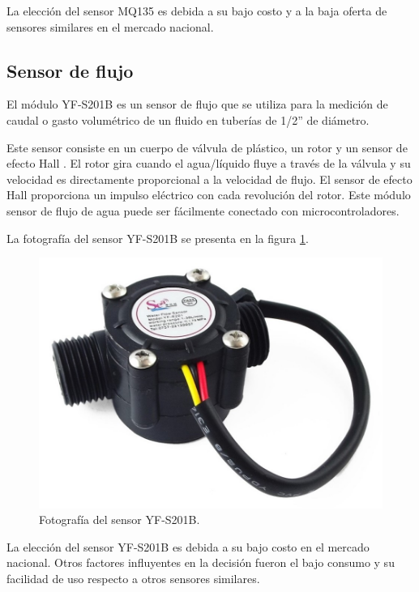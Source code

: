 
La elección del sensor MQ135 es debida a su bajo costo y a la baja oferta de sensores similares en el mercado nacional.

\subsection{Sensor de flujo}

El módulo YF-S201B \citep{WEBSITE:YF-S201B} es un sensor de flujo que se utiliza para la medición de caudal o gasto volumétrico de un fluido en tuberías de 1/2” de diámetro.

Este sensor consiste en un cuerpo de válvula de plástico, un rotor y un sensor de efecto Hall \citep{WEBSITE:EFECTOHALL}. El rotor gira cuando el agua/líquido fluye a través de la válvula y su velocidad es directamente proporcional a la velocidad de flujo. El sensor de efecto Hall proporciona un impulso eléctrico con cada revolución del rotor. Este módulo sensor de flujo de agua puede ser fácilmente conectado con microcontroladores.

La fotografía del sensor YF-S201B se presenta en la figura \ref{fig:fotografiaYF-S201B}.

\begin{figure}[H]
	\centering
	\includegraphics[width=.5\textwidth]{./Figures/YF-S201B.jpg}
	\caption{Fotografía del sensor YF-S201B\protect\footnotemark.}
	\label{fig:fotografiaYF-S201B}
\end{figure}


La elección del sensor YF-S201B es debida a su bajo costo en el mercado nacional. Otros factores influyentes en la decisión fueron el bajo consumo y su facilidad de uso respecto a otros sensores similares.

